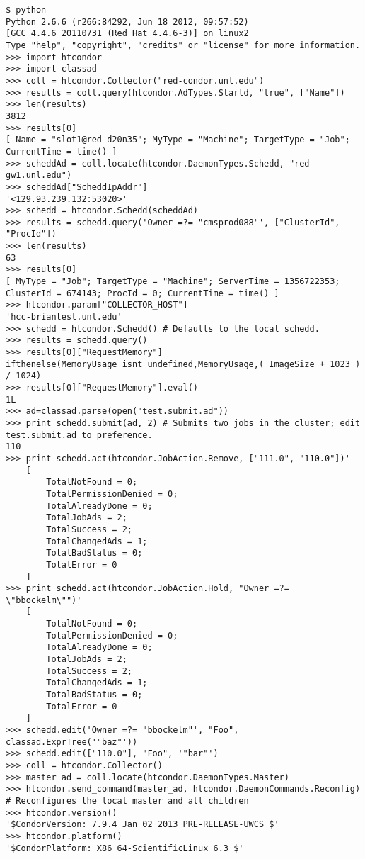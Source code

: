 \footnotesize
\begin{verbatim}
$ python
Python 2.6.6 (r266:84292, Jun 18 2012, 09:57:52) 
[GCC 4.4.6 20110731 (Red Hat 4.4.6-3)] on linux2
Type "help", "copyright", "credits" or "license" for more information.
>>> import htcondor
>>> import classad
>>> coll = htcondor.Collector("red-condor.unl.edu")
>>> results = coll.query(htcondor.AdTypes.Startd, "true", ["Name"])
>>> len(results)
3812
>>> results[0]
[ Name = "slot1@red-d20n35"; MyType = "Machine"; TargetType = "Job"; CurrentTime = time() ]
>>> scheddAd = coll.locate(htcondor.DaemonTypes.Schedd, "red-gw1.unl.edu")
>>> scheddAd["ScheddIpAddr"]
'<129.93.239.132:53020>'
>>> schedd = htcondor.Schedd(scheddAd)
>>> results = schedd.query('Owner =?= "cmsprod088"', ["ClusterId", "ProcId"])
>>> len(results)
63
>>> results[0]
[ MyType = "Job"; TargetType = "Machine"; ServerTime = 1356722353; ClusterId = 674143; ProcId = 0; CurrentTime = time() ]
>>> htcondor.param["COLLECTOR_HOST"]
'hcc-briantest.unl.edu'
>>> schedd = htcondor.Schedd() # Defaults to the local schedd.
>>> results = schedd.query()
>>> results[0]["RequestMemory"]
ifthenelse(MemoryUsage isnt undefined,MemoryUsage,( ImageSize + 1023 ) / 1024)
>>> results[0]["RequestMemory"].eval()
1L
>>> ad=classad.parse(open("test.submit.ad"))
>>> print schedd.submit(ad, 2) # Submits two jobs in the cluster; edit test.submit.ad to preference.
110
>>> print schedd.act(htcondor.JobAction.Remove, ["111.0", "110.0"])'
    [
        TotalNotFound = 0; 
        TotalPermissionDenied = 0; 
        TotalAlreadyDone = 0; 
        TotalJobAds = 2; 
        TotalSuccess = 2; 
        TotalChangedAds = 1; 
        TotalBadStatus = 0; 
        TotalError = 0
    ]
>>> print schedd.act(htcondor.JobAction.Hold, "Owner =?= \"bbockelm\"")'
    [
        TotalNotFound = 0; 
        TotalPermissionDenied = 0; 
        TotalAlreadyDone = 0; 
        TotalJobAds = 2; 
        TotalSuccess = 2; 
        TotalChangedAds = 1; 
        TotalBadStatus = 0; 
        TotalError = 0
    ]
>>> schedd.edit('Owner =?= "bbockelm"', "Foo", classad.ExprTree('"baz"'))
>>> schedd.edit(["110.0"], "Foo", '"bar"')
>>> coll = htcondor.Collector()
>>> master_ad = coll.locate(htcondor.DaemonTypes.Master)
>>> htcondor.send_command(master_ad, htcondor.DaemonCommands.Reconfig) # Reconfigures the local master and all children
>>> htcondor.version()
'$CondorVersion: 7.9.4 Jan 02 2013 PRE-RELEASE-UWCS $'
>>> htcondor.platform()
'$CondorPlatform: X86_64-ScientificLinux_6.3 $'

\end{verbatim}
\normalsize

